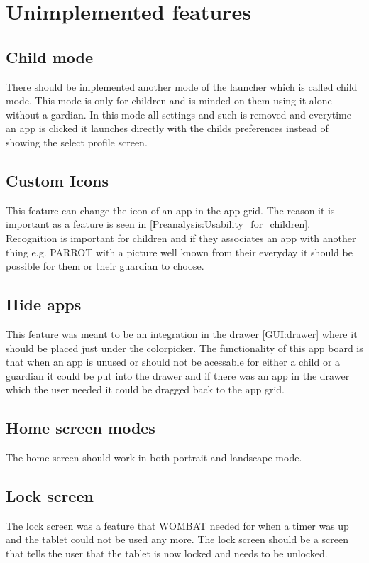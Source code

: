 \section{Unimplemented features}
\label{backlog_unimplemented}

\subsection{Child mode}
\label{backlog:child_mode}
There should be implemented another mode of the launcher which is called child mode. This mode is only for children and is minded on them using it alone without a gardian. In this mode all settings and such is removed and everytime an app is clicked it launches directly with the childs preferences instead of showing the select profile screen.

\subsection{Custom Icons}
\label{backlog:custom_icons}
This feature can change the icon of an app in the app grid. The reason it is important as a feature is seen in \autoref{Preanalysis:Usability_for_children}. 
Recognition is important for children and if they associates an app with another thing e.g. PARROT with a picture well known from their everyday it should be possible for them or their guardian to choose.

\subsection{Hide apps}
\label{backlog:hide_apps}
This feature was meant to be an integration in the drawer \autoref{GUI:drawer} where it should be placed just under the colorpicker. The functionality of this app board is that when an app is unused or should not be acessable for either a child or a guardian it could be put into the drawer and if there was an app in the drawer which the user needed it could be dragged back to the app grid.

\subsection{Home screen modes}
\label{backlog:home_screen_modes}
The home screen should work in both portrait and landscape mode.

\subsection{Lock screen}
\label{backlog:lock_screen}
The lock screen was a feature that WOMBAT needed for when a timer was up and the tablet could not be used any more. The lock screen should be a screen that tells the user that the tablet is now locked and needs to be unlocked.


